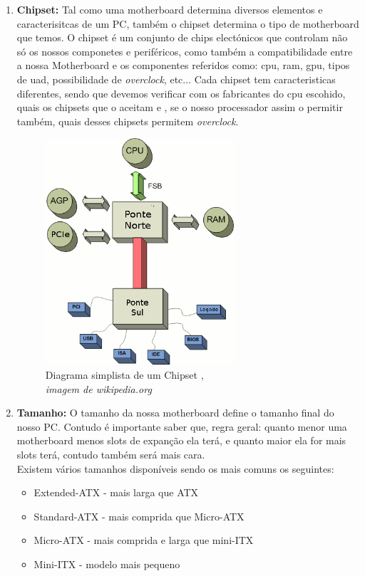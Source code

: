\begin{enumerate}
	\item \textbf{Chipset:} Tal como uma motherboard determina diversos elementos e caracterisitcas de um PC, também o chipset determina o tipo de motherboard que temos. O chipset é um conjunto de chips electónicos que controlam não só os nossos componetes e periféricos, como também a compatibilidade entre a nossa Motherboard e os componentes referidos como: \ac{cpu}, \ac{ram}, \ac{gpu}, tipos de \ac{uad}, possibilidade de \textit{overclock}, etc... Cada chipset tem caracteristicas diferentes, sendo que devemos  verificar com os fabricantes do \ac{cpu} escohido, quais os chipsets que o aceitam e , se o nosso processador assim o permitir também, quais desses chipsets permitem \textit{overclock}. 

	\begin{figure}[H]
		\centering
		\includegraphics[width=7cm]{./chipsetchart.png}
		\caption{Diagrama simplista de um Chipset , \\ \textsl{imagem de wikipedia.org}}
		\label{fig.cabeçasparafusos}
	\end{figure} 
	
	
	\item \textbf{Tamanho:} O tamanho da nossa motherboard define o tamanho final do nosso PC. Contudo é importante saber que, regra geral: quanto menor uma motherboard menos slots de expanção ela terá, e quanto maior ela for mais slots terá, contudo também será mais cara. \\
	Existem vários tamanhos disponíveis sendo os mais comuns os seguintes:
	
	\begin{itemize}
	\item Extended-ATX - \small mais larga que ATX
	\item Standard-ATX - \small mais comprida que Micro-ATX
	\item Micro-ATX - \small mais comprida e larga que mini-ITX
	\item Mini-ITX - \small modelo mais pequeno
	\end{itemize}	
	

\end{enumerate}
